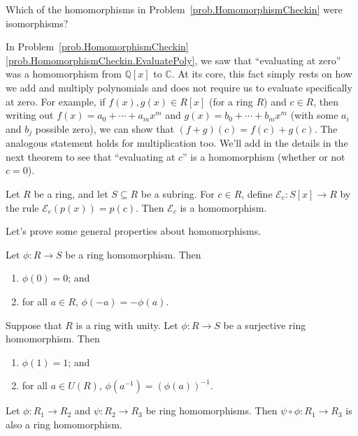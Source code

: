 \begin{problem}
Which of the homomorphisms in Problem~\ref{prob.HomomorphismCheckin} were isomorphisms?
\end{problem}

In Problem~\ref{prob.HomomorphismCheckin}\ref{prob.HomomorphismCheckin.EvaluatePoly}, we saw that ``evaluating at zero'' was a homomorphism from $\mathbb{Q}[x]$ to  $\mathbb{C}$. At its core, this fact simply rests on how we add and multiply polynomials and does not require us to evaluate specifically at zero. For example, if $f(x),g(x)\in R[x]$ (for a ring $R$) and $c\in R$, then writing out $f(x)=a_0+\cdots+a_mx^m$ and $g(x)=b_0+\cdots+b_mx^m$ (with some $a_i$ and $b_j$ possible zero), we can show that $(f+g)(c) = f(c) + g(c)$. The analogous statement holds for multiplication too. We'll add in the details in the next theorem to see that ``evaluating at $c$'' is a homomorphism (whether or not $c = 0$).

\begin{theorem}\label{thm.EvalHom}
Let $R$ be a ring, and let $S\subseteq R$ be a subring. For $c\in R$, define  $\mathcal{E}_c:S[x] \rightarrow R$ by the rule $\mathcal{E}_c(p(x)) = p(c)$. Then $\mathcal{E}_c$ is a homomorphism.
\end{theorem}

Let's prove some general properties about homomorphisms.

\begin{theorem}\label{thm.HomPreservesAdditiveProperties}
Let $\phi:R\to S$  be a ring homomorphism. Then 
\begin{enumerate}
\item $\phi(0) = 0$; and
\item for all $a\in R$, $\phi(-a) = -\phi(a)$.
\end{enumerate}
\end{theorem}

\begin{theorem}\label{thm.HomPreservesMultiplicativeProperties}
Suppose that $R$ is a ring with unity. Let $\phi:R\to S$  be a surjective ring homomorphism.  Then 
\begin{enumerate}
\item $\phi(1) = 1$; and
\item for all $a\in U(R)$, $\phi(a^{-1}) = (\phi(a))^{-1}$.
\end{enumerate}
\end{theorem}

\begin{theorem}\label{thm.CompositionHomomorphism}
Let $\phi:R_1\to R_2$ and $\psi:R_2\to R_3$ be ring homomorphisms. Then $\psi\circ\phi:R_1 \to R_3$ is also a ring homomorphism.
\end{theorem}


